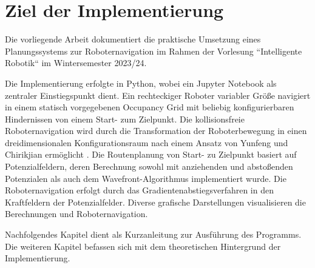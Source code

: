 \chapter{Ziel der Implementierung}

Die vorliegende Arbeit dokumentiert die praktische Umsetzung eines Planungssystems zur Roboternavigation im Rahmen der Vorlesung ``Intelligente Robotik`` im Wintersemester 2023/24.

Die Implementierung erfolgte in Python, wobei ein Jupyter Notebook als zentraler Einstiegspunkt dient. 
Ein rechteckiger Roboter variabler Größe navigiert in einem statisch vorgegebenen Occupancy Grid mit beliebig konfigurierbaren Hindernissen von einem Start- zum Zielpunkt.
Die kollisionsfreie Roboternavigation wird durch die Transformation der Roboterbewegung in einen dreidimensionalen Konfigurationsraum nach einem Ansatz von Yunfeng und Chirikjian ermöglicht \cite{wang.2000}.
Die Routenplanung von Start- zu Zielpunkt basiert auf Potenzialfeldern, deren Berechnung sowohl mit anziehenden und abstoßenden Potenzialen als auch dem Wavefront-Algorithmus implementiert wurde. 
Die Roboternavigation erfolgt durch das Gradientenabstiegsverfahren in den Kraftfeldern der Potenzialfelder. 
Diverse grafische Darstellungen visualisieren die Berechnungen und Roboternavigation.

Nachfolgendes Kapitel dient als Kurzanleitung zur Ausführung des Programms. Die weiteren Kapitel befassen sich mit dem theoretischen Hintergrund der Implementierung.

%
